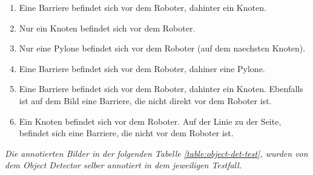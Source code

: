 \begin{enumerate}
    \item Eine Barriere befindet sich vor dem Roboter, dahinter ein Knoten.
    \item Nur ein Knoten befindet sich vor dem Roboter.
    \item Nur eine Pylone befindet sich vor dem Roboter (auf dem naechsten Knoten).
    \item Eine Barriere befindet sich vor dem Roboter, dahiner eine Pylone.
    \item Eine Barriere befindet sich vor dem Roboter, dahinter ein Knoten. Ebenfalls ist auf dem Bild eine Barriere, die nicht direkt vor dem Roboter ist.
    \item Ein Knoten befindet sich vor dem Roboter. Auf der Linie zu der Seite, befindet sich eine Barriere, die nicht vor dem Roboter ist.
\end{enumerate}

\textit{Die annotierten Bilder in der folgenden Tabelle \ref{table:object-det-test}, wurden von dem Object Detector selber annotiert in dem jeweiligen Testfall.}

